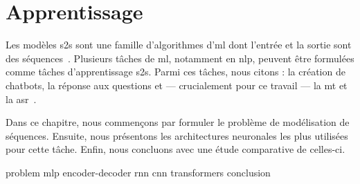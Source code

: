 \chapter{Apprentissage }
\label{chap.s2s}

Les modèles \gls{s2s} sont une famille d'algorithmes d'\gls{ml}
dont l'entrée et la sortie sont des séquences~\cite{Martins_2018}.
Plusieurs tâches de \gls{ml}, notamment en \gls{nlp}, 
peuvent être formulées comme tâches d'apprentissage \gls{s2s}.
Parmi ces tâches, nous citons : la création de chatbots, la réponse aux questions
et --- crucialement pour ce travail --- la \gls{mt} et la \gls{asr}~\cite{Fathi_2021}.

Dans ce chapitre, nous commençons par formuler le problème de modélisation de séquences.
Ensuite, nous présentons les architectures neuronales les plus utilisées pour cette tâche.
Enfin, nous concluons avec une étude comparative de celles-ci.

{problem}
{mlp}
{encoder-decoder}
{rnn}
{cnn}
{transformers}
{conclusion}
